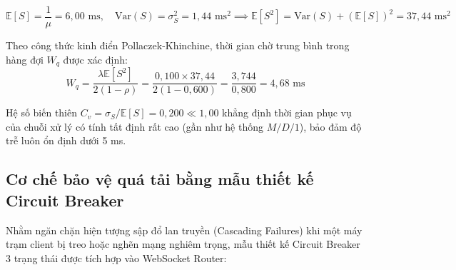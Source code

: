 \begin{equation}
\mathbb{E}[S] = \frac{1}{\mu} = 6{,}00\text{ ms}, \quad \text{Var}(S) = \sigma_S^2 = 1{,}44\text{ ms}^2 \implies \mathbb{E}[S^2] = \text{Var}(S) + (\mathbb{E}[S])^2 = 37{,}44\text{ ms}^2
\label{eq:service-time-moments}
\end{equation}

Theo công thức kinh điển Pollaczek-Khinchine, thời gian chờ trung bình trong hàng đợi $W_q$ được xác định:
\begin{equation}
W_q = \frac{\lambda \mathbb{E}[S^2]}{2(1 - \rho)} = \frac{0{,}100 \times 37{,}44}{2(1 - 0{,}600)} = \frac{3{,}744}{0{,}800} = 4{,}68\text{ ms}
\label{eq:pollaczek-khinchine-waiting-time}
\end{equation}

\begin{table}[H]
\centering
\caption{Đặc tính phân phối thời gian phục vụ và độ trễ hàng đợi $M/G/1$ theo loại mục tiêu}
\label{tab:mg1-service-time-distribution}
\end{table}

Hệ số biến thiên $C_v = \sigma_S / \mathbb{E}[S] = 0{,}200 \ll 1{,}00$ khẳng định thời gian phục vụ của chuỗi xử lý có tính tất định rất cao (gần như hệ thống $M/D/1$), bảo đảm độ trễ luôn ổn định dưới 5 ms.

\subsection{Cơ chế bảo vệ quá tải bằng mẫu thiết kế Circuit Breaker}

\hspace{0.5cm} Nhằm ngăn chặn hiện tượng sập đổ lan truyền (Cascading Failures) khi một máy trạm client bị treo hoặc nghẽn mạng nghiêm trọng, mẫu thiết kế Circuit Breaker 3 trạng thái được tích hợp vào WebSocket Router:

